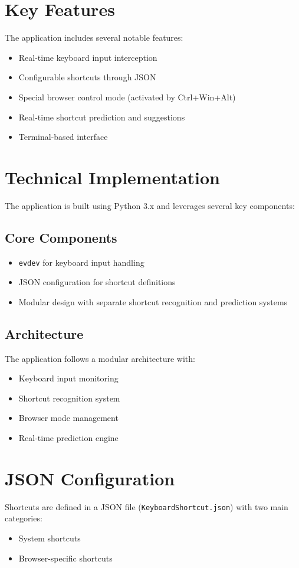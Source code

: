\documentclass{article}
\begin{document}
\section{Key Features}
The application includes several notable features:
\begin{itemize}
    \item Real-time keyboard input interception
    \item Configurable shortcuts through JSON
    \item Special browser control mode (activated by Ctrl+Win+Alt)
    \item Real-time shortcut prediction and suggestions
    \item Terminal-based interface
\end{itemize}

\section{Technical Implementation}
The application is built using Python 3.x and leverages several key components:

\subsection{Core Components}
\begin{itemize}
    \item \texttt{evdev} for keyboard input handling
    \item JSON configuration for shortcut definitions
    \item Modular design with separate shortcut recognition and prediction systems
\end{itemize}

\subsection{Architecture}
The application follows a modular architecture with:
\begin{itemize}
    \item Keyboard input monitoring
    \item Shortcut recognition system
    \item Browser mode management
    \item Real-time prediction engine
\end{itemize}

\section{JSON Configuration}
Shortcuts are defined in a JSON file (\texttt{KeyboardShortcut.json}) with two main categories:
\begin{itemize}
    \item System shortcuts
    \item Browser-specific shortcuts
\end{itemize}
\end{document}
